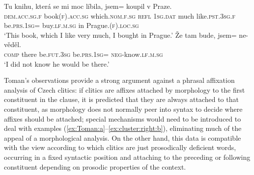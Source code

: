 \documentclass[output=paper]{langsci/langscibook}
\begin{document}
\begin{exe}
\ex\label{ex:Toman:a} 
\begin{xlist}
\end{xlist}
\ex\label{ex:Toman:b}  \begin{xlist}
\end{xlist}
\ex\label{ex:cluster:right:a}
\gll Tu knihu, která se mi moc líbila, jsem= koupil v Praze.\\
\textsc{dem.acc.sg.f} book\textsc{(f).acc.sg} which.\textsc{nom.f.sg} \textsc{refl} \textsc{1sg.dat} much like.\textsc{pst.3sg.f} be.\textsc{prs.1sg}= buy.\textsc{lf.m.sg} in Prague.\textsc{(f).loc.sg}\\
\glt ‘This book, which I like very much, I bought in Prague.’
\ex\label{ex:cluster:right:b}
\gll \v{Z}e tam bude, jsem= ne-v\v{e}d\v{e}l.\\
\textsc{comp} there be.\textsc{fut.3sg} be.\textsc{prs.1sg}= \textsc{neg}-know.\textsc{lf.m.sg}\\
\glt ‘I did not know he would be there.’
\end{exe}

Toman's observations provide a strong argument against a phrasal affixation analysis of Czech clitics: if clitics are affixes attached by morphology to the first constituent in the clause, it is predicted that they are always attached to that constituent, as morphology does not normally peer into syntax to decide where affixes should be attached; special mechanisms would need to be introduced to deal with examples (\ref{ex:Toman:a}--\ref{ex:cluster:right:b}), eliminating much of the appeal of a morphological analysis. On the other hand, this data is compatible with the view according to which clitics are just prosodically deficient words, occurring in a fixed syntactic position and attaching to the preceding or following constituent depending on prosodic properties of the context.
\end{document}
